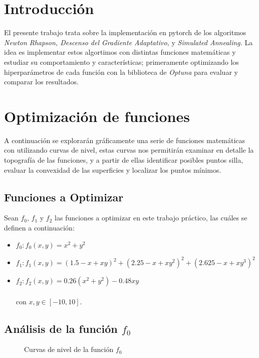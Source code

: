 \section{Introducción}

El presente trabajo trata sobre la implementación en pytorch de los algoritmos \textit{Newton Rhapson, Descenso del Gradiente Adaptativo,} y \textit{Simulated Annealing.} La idea es implementar estos algortimos con distintas funciones matemáticas y estudiar su comportamiento y características; primeramente optimizando los hiperparámetros de cada función con la biblioteca de \textit{Optuna} para evaluar y comparar los resultados.

\section{Optimización de funciones}

A continuación se explorarán gráficamente una serie de funciones matemáticas con utilizando curvas de nivel, estas curvas nos permitirán examinar en detalle la topografía de las funciones, y a partir de ellas identificar posibles puntos silla, evaluar la convexidad de las superficies y localizar los puntos mínimos.

\subsection{Funciones a Optimizar}

Sean $f_0$, $f_1$ y $f_2$ las funciones a optimizar en este trabajo práctico, las cuáles se definen a continuación:

\begin{itemize}
    \item $f_0 : f_0(x,y) = x^2 + y^2$
    \item $f_1 : f_1(x,y) = (1.5 - x +xy)^2 + (2.25 -x + xy^2)^2 + (2.625 - x +xy^3)^2$
    \item $f_2 : f_2(x,y) = 0.26(x^2 + y^2) - 0.48xy$ \\
    \\
    con $x,y\in\left[-10,10\right]$.
\end{itemize}


\newpage

\subsection{Análisis de la función $f_0$}
\begin{figure}[h!]
  \centering
    
  \caption{Curvas de nivel de la función $f_0$}
  \captionsetup{justification=centering}
  \label{fig:CF0}
\end{figure}

